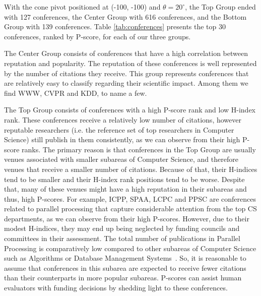 \documentclass[man]{apa6}
\let \cite \parencite
\begin{document}
With the cone pivot positioned at (-100, -100) and $ \theta=20^{\circ} $, the Top Group ended with 127 conferences, the 
Center Group with 616 conferences, and the Bottom Group with 139 conferences. Table 
\ref{tab:conferences} presents the top 30 conferences, ranked by P-score, for each of our three groups.

The Center Group consists of conferences that have a high correlation between reputation and
popularity. The reputation of these conferences is well represented by the number of citations
they receive. This group represents conferences that are relatively easy to classify regarding
their scientific impact. Among them we find WWW, CVPR and KDD, to name a few.

The Top Group consists of conferences with a high P-score rank and low H-index rank. These conferences
receive a relatively low number of citations, however reputable researchers (i.e. the reference set of top researchers in Computer Science) still publish 
in them consistently, as we can observe from their high P-score ranks. The primary reason is that
conferences in the Top Group are usually venues associated with smaller subareas of Computer Science, and therefore venues that receive a smaller
number of citations. Because of that, their H-indices tend to be smaller and their H-index rank positions tend to be worse. Despite that, many of these venues might have a high reputation in their subareas and thus, high P-scores. 
For example, ICPP, SPAA, LCPC and PPSC are conferences related to parallel processing that capture
considerable attention from the top CS departments, as we can observe from their high P-scores. However,
due to their modest H-indices, they may end up being neglected by funding councils and committees in
their assessment. The total number of publications in Parallel Processing is comparatively low 
compared to other subareas of Computer Science such as Algorithms or Database Management Systems~\cite{Hoonlor2013}. So, it is reasonable to assume that conferences 
in this subarea are expected to receive fewer citations than their counterparts in more popular subareas.
P-scores can assist human evaluators with funding decisions by shedding light to these conferences.
\end{document}

